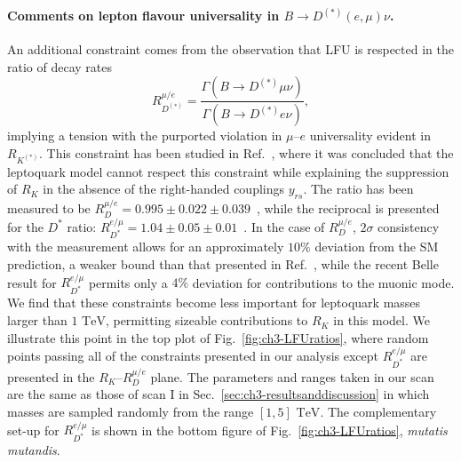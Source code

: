 \paragraph{Comments on lepton flavour universality in $B \to
  D^{(*)} (e,\mu) \nu$.} An additional constraint comes from the
observation that LFU is respected in the ratio of decay rates
\begin{equation}
  R_{D^{(*)}}^{\mu/e} = \frac{\Gamma(B \rightarrow
    D^{(*)} \mu \nu)}{\Gamma(B \rightarrow
    D^{(*)} e \nu)},
\end{equation}
implying a tension with the purported violation in $\mu$--$e$ universality
evident in $R_{K^{(*)}}$. This constraint has been studied in
Ref.~\cite{Becirevic:2016oho}, where it was concluded that the leptoquark model
cannot respect this constraint while explaining the suppression of $R_K$ in the
absence of the right-handed couplings $y_{rs}$. The ratio has been measured to
be $R_D^{\mu/e} = 0.995 \pm 0.022 \pm 0.039$~\cite{Glattauer:2015teq}, while the
reciprocal is presented for the $D^*$ ratio: $R_{D^{*}}^{e/\mu} = 1.04 \pm 0.05
\pm 0.01$~\cite{Abdesselam:2017kjf}. In the case of $R_D^{\mu/e}$, $2\sigma$
consistency with the measurement allows for an approximately $10\%$ deviation
from the SM prediction, a weaker bound than that presented in
Ref.~\cite{Becirevic:2016oho}, while the recent Belle result for
$R_{D^{*}}^{e/\mu}$ permits only a $4\%$ deviation for contributions to the
muonic mode. We find that these constraints become less important for leptoquark
masses larger than $ 1 \text{ TeV}$, permitting sizeable contributions to $R_K$
in this model. We illustrate this point in the top plot of
Fig.~\ref{fig:ch3-LFUratios}, where random points passing all of the constraints
presented in our analysis except $R_{D^{*}}^{e/\mu}$ are presented in the
$R_K$--$R_D^{\mu/e}$ plane. The parameters and ranges taken in our scan are the
same as those of scan I in Sec.~\ref{sec:ch3-resultsanddiscussion} in which masses
are sampled randomly from the range $[1,5] \text{ TeV}$. The complementary
set-up for $R_{D^{*}}^{e/\mu}$ is shown in the bottom figure of
Fig.~\ref{fig:ch3-LFUratios}, \textit{mutatis mutandis}.

